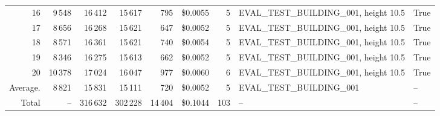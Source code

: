 \documentclass[a4paper,11pt]{article}
\begin{document}
\begin{table}[ht]
\begin{tabular}{r r r r r r r p{3cm} l}
16 & 9\,548 & 16\,412 & 15\,617 & 795 & \$0.0055 & 5 & EVAL\_TEST\_BUILDING\_001, height 10.5 & True \\
17 & 8\,656 & 16\,268 & 15\,621 & 647 & \$0.0052 & 5 & EVAL\_TEST\_BUILDING\_001, height 10.5 & True \\
18 & 8\,571 & 16\,361 & 15\,621 & 740 & \$0.0054 & 5 & EVAL\_TEST\_BUILDING\_001, height 10.5 & True \\
19 & 8\,346 & 16\,275 & 15\,613 & 662 & \$0.0052 & 5 & EVAL\_TEST\_BUILDING\_001, height 10.5 & True \\
20 & 10\,378 & 17\,024 & 16\,047 & 977 & \$0.0060 & 6 & EVAL\_TEST\_BUILDING\_001, height 10.5 & True \\
\hline
Average. & 8\,821 & 15\,831 & 15\,111 & 720 & \$0.0052 & 5 & EVAL\_TEST\_BUILDING\_001 & -- \\
Total & -- & 316\,632 & 302\,228 & 14\,404 & \$0.1044 & 103 & -- & -- \\
\hline
\end{tabular}
\end{table}

\clearpage
\end{document}

